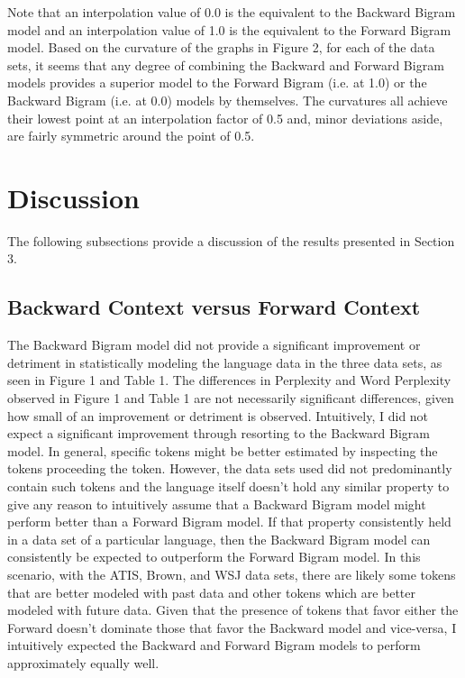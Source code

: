 \documentclass{article} %
\begin{document}
Note that an interpolation value of 0.0 is the equivalent to the Backward Bigram model and an interpolation value of 1.0 is the equivalent to the Forward Bigram model. Based on the curvature of the graphs in Figure 2, for each of the data sets, it seems that any degree of combining the Backward and Forward Bigram models provides a superior model to the Forward Bigram (i.e. at 1.0) or the Backward Bigram (i.e. at 0.0) models by themselves. The curvatures all achieve their lowest point at an interpolation factor of 0.5 and, minor deviations aside, are fairly symmetric around the point of 0.5.  

\section{Discussion}

The following subsections provide a discussion of the results presented in Section 3.

\subsection{Backward Context versus Forward Context}

The Backward Bigram model did not provide a significant improvement or detriment in statistically modeling the language data in the three data sets, as seen in Figure 1 and Table 1. The differences in Perplexity and Word Perplexity observed in Figure 1 and Table 1 are not necessarily significant differences, given how small of an improvement or detriment is observed. Intuitively, I did not expect a significant improvement through resorting to the Backward Bigram model. In general, specific tokens might be better estimated by inspecting the tokens proceeding the token. However, the data sets used did not predominantly contain such tokens and the language itself doesn't hold any similar property to give any reason to intuitively assume that a Backward Bigram model might perform better than a Forward Bigram model. If that property consistently held in a data set of a particular language, then the Backward Bigram model can consistently be expected to outperform the Forward Bigram model. In this scenario, with the ATIS, Brown, and WSJ data sets, there are likely some tokens that are better modeled with past data and other tokens which are better modeled with future data. Given that the presence of tokens that favor either the Forward doesn't dominate those that favor the Backward model and vice-versa, I intuitively expected the Backward and Forward Bigram models to perform approximately equally well.
\end{document}
